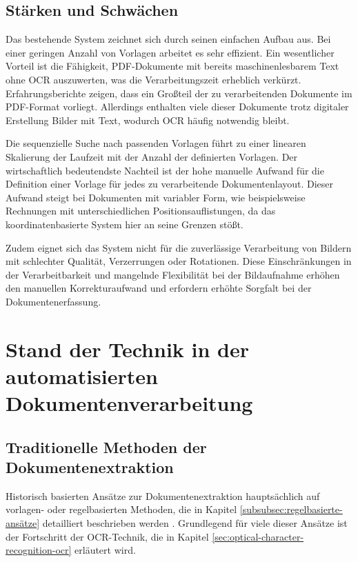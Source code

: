 \subsection{Stärken und Schwächen}
\label{subsec:stärken-und-schwächen}

Das bestehende System zeichnet sich durch seinen einfachen Aufbau aus. Bei einer geringen Anzahl von Vorlagen arbeitet es sehr effizient. Ein wesentlicher Vorteil ist die Fähigkeit, PDF-Dokumente mit bereits maschinenlesbarem Text ohne \gls{OCR} auszuwerten, was die Verarbeitungszeit erheblich verkürzt. Erfahrungsberichte zeigen, dass ein Großteil der zu verarbeitenden Dokumente im PDF-Format vorliegt. Allerdings enthalten viele dieser Dokumente trotz digitaler Erstellung Bilder mit Text, wodurch \gls{OCR} häufig notwendig bleibt.

Die sequenzielle Suche nach passenden Vorlagen führt zu einer linearen Skalierung der Laufzeit mit der Anzahl der definierten Vorlagen. Der wirtschaftlich bedeutendste Nachteil ist der hohe manuelle Aufwand für die Definition einer Vorlage für jedes zu verarbeitende Dokumentenlayout. Dieser Aufwand steigt bei Dokumenten mit variabler Form, wie beispielsweise Rechnungen mit unterschiedlichen Positionsauflistungen, da das koordinatenbasierte System hier an seine Grenzen stößt.

Zudem eignet sich das System nicht für die zuverlässige Verarbeitung von Bildern mit schlechter Qualität, Verzerrungen oder Rotationen. Diese Einschränkungen in der Verarbeitbarkeit und mangelnde Flexibilität bei der Bildaufnahme erhöhen den manuellen Korrekturaufwand und erfordern erhöhte Sorgfalt bei der Dokumentenerfassung.

\section{Stand der Technik in der automatisierten Dokumentenverarbeitung}
\label{sec:stand-der-technik-in-der-automatisierten-dokumentenverarbeitung}

\subsection{Traditionelle Methoden der Dokumentenextraktion}
\label{subsec:traditionelle-Methoden-der-Dokumentenverarbeitung}

Historisch basierten Ansätze zur Dokumentenextraktion hauptsächlich auf vorlagen- oder regelbasierten Methoden, die in Kapitel \ref{subsubsec:regelbasierte-ansätze} detailliert beschrieben werden \cite{YeYibin2018Auso, ChowdhuryGobindaG.1999Tmfi}. Grundlegend für viele dieser Ansätze ist der Fortschritt der \gls{OCR}-Technik, die in Kapitel \ref{sec:optical-character-recognition-ocr} erläutert wird.

